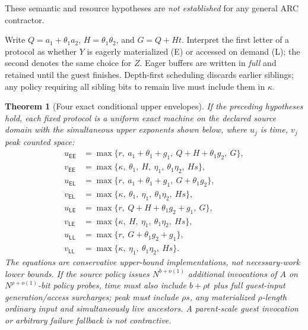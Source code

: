 \documentclass[11pt]{article}
\newtheorem{theorem}{Theorem}
\newcommand{\EE}{\mathsf{EE}}
\newcommand{\EL}{\mathsf{EL}}
\newcommand{\LE}{\mathsf{LE}}
\newcommand{\LL}{\mathsf{LL}}
\begin{document}
These semantic and resource hypotheses are \emph{not established}
for any general ARC contractor.

Write $Q=a_1+\theta_1a_2$, $H=\theta_1\theta_2$,
and $G=Q+Ht$. Interpret the first letter of a protocol as
whether $Y$ is eagerly materialized (\textsf E) or accessed on
demand (\textsf L); the second denotes the same choice for $Z$.
Eager buffers are written in \emph{full} and retained until the
guest finishes. Depth-first scheduling discards earlier siblings;
any policy requiring all sibling bits to remain live must include
them in $\kappa$.

\begin{theorem}[Four exact conditional upper envelopes]
\label{th:modes}
If the preceding hypotheses hold, each fixed protocol is a
uniform exact machine on the declared source domain with
the simultaneous upper exponents shown below, where
$u_j$ is time, $v_j$ peak counted space:
\[
\boxed{\begin{aligned}
u_{\EE}&=\max\{r,\ a_1+\theta_1+g_1,\
                    Q+H+\theta_1g_2,\ G\},\\
v_{\EE}&=\max\{\kappa,\ \theta_1,\ H,\ \eta_1,\
                       \theta_1\eta_2,\ Hs\},\\[1pt]
u_{\EL}&=\max\{r,\ a_1+\theta_1+g_1,\
                    G+\theta_1g_2\},\\
v_{\EL}&=\max\{\kappa,\ \theta_1,\ \eta_1,\
                       \theta_1\eta_2,\ Hs\},\\[1pt]
u_{\LE}&=\max\{r,\ Q+H+\theta_1g_2+g_1,\ G\},\\
v_{\LE}&=\max\{\kappa,\ H,\ \eta_1,\
                       \theta_1\eta_2,\ Hs\},\\[1pt]
u_{\LL}&=\max\{r,\ G+\theta_1g_2+g_1\},\\
v_{\LL}&=\max\{\kappa,\ \eta_1,\
                       \theta_1\eta_2,\ Hs\}.
\end{aligned}}\tag{1}
\]
The equations are conservative \emph{upper-bound implementations},
not necessary-work lower bounds. If the source policy issues
$N^{b+o(1)}$ additional invocations of $A$ on
$N^{\rho+o(1)}$-bit policy probes, time must also include
$b+\rho t$ plus full guest-input generation/access surcharges;
peak must include $\rho s$, any materialized $\rho$-length
ordinary input and simultaneously live ancestors.
A parent-scale guest invocation or arbitrary failure fallback
is not contractive.
\end{theorem}
\end{document}
